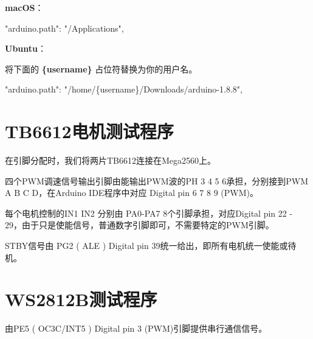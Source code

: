 \begin{enumerate}
        \textbf{macOS}：
    
        \begin{tcolorbox}    
            "arduino.path": "/Applications",
        \end{tcolorbox}

        \textbf{Ubuntu}：
    
        将下面的 \textbf{\{username\}} 占位符替换为你的用户名。
        \begin{tcolorbox}
            "arduino.path": "/home/\{username\}/Downloads/arduino-1.8.8",
        \end{tcolorbox}
    \end{enumerate}



\section{TB6612电机测试程序}

在引脚分配时，我们将两片TB6612连接在Mega2560上。

四个PWM调速信号输出引脚由能输出PWM波的PH 3 4 5 6承担，分别接到PWM A B C D，在Arduino IDE程序中对应 Digital pin 6 7 8 9 (PWM)。

每个电机控制的IN1 IN2 分别由 PA0-PA7 8个引脚承担，对应Digital pin 22 - 29，由于只是使能信号，普通数字引脚即可，不需要特定的PWM引脚。

STBY信号由 PG2 ( ALE ) Digital pin 39统一给出，即所有电机统一使能或待机。

\section{WS2812B测试程序}

由PE5 ( OC3C/INT5 ) Digital pin 3 (PWM)引脚提供串行通信信号。